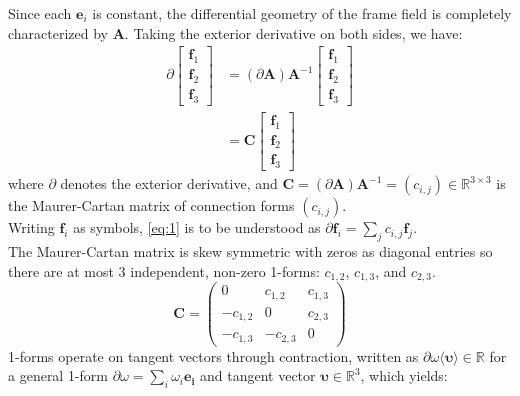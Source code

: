 Since each $\mathbf{e}_i$ is constant, the differential geometry of the frame field is completely characterized by $\mathbf{A}$. Taking the exterior derivative on both sides, we have:
\begin{equation} \label{eq:1}
\begin{split}
    \partial \begin{bmatrix}
                \mathbf{f}_1 \\
                \mathbf{f}_2 \\
                \mathbf{f}_3
            \end{bmatrix} &= (\partial \mathbf{A})\mathbf{A}^{-1}  \begin{bmatrix}
                \mathbf{f}_1 \\
                \mathbf{f}_2 \\
                \mathbf{f}_3
            \end{bmatrix} \\
            &= \mathbf{C}
            \begin{bmatrix}
                \mathbf{f}_1 \\
                \mathbf{f}_2 \\
                \mathbf{f}_3
            \end{bmatrix}
\end{split}
\end{equation}
where $\partial$ denotes the exterior derivative, and $\mathbf{C} = (\partial \mathbf{A}) \mathbf{A}^{-1} = (c_{i,j}) \in \mathbb{R}^{3 \times 3}$ is the Maurer-Cartan matrix of connection forms $(c_{i,j})$. \\
Writing $\mathbf{f}_i$ as symbols, \ref{eq:1} is to be understood as $\partial \mathbf{f}_i = \sum_j{c_{i,j}\mathbf{f}_j}$. \\
The Maurer-Cartan matrix is skew symmetric with zeros as diagonal entries so there are at most 3 independent, non-zero 1-forms: $c_{1,2}$, $c_{1,3}$, and $c_{2,3}$. \\
\begin{equation}
    \mathbf{C} = \begin{pmatrix}
    0 & c_{1,2} & c_{1,3} \\
    -c_{1,2} & 0 & c_{2,3} \\
    -c_{1,3} & -c_{2,3} & 0
    \end{pmatrix}
\end{equation}
1-forms operate on tangent vectors through contraction, written as $\partial \omega \langle \boldsymbol{\upsilon} \rangle \in \mathbb{R}$ for a general 1-form $\partial \omega = \sum_i{\omega_i \mathbf{e_i}}$ and tangent vector $\boldsymbol{\upsilon} \in \mathbb{R}^3$, which yields:
